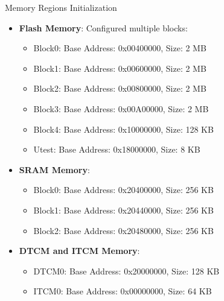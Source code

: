 \begin{frame}{Memory Regions Initialization}
    \begin{itemize}
        \item \textbf{Flash Memory}: Configured multiple blocks:
        \begin{itemize}
            \item Block0: Base Address: 0x00400000, Size: 2 MB
            \item Block1: Base Address: 0x00600000, Size: 2 MB
            \item Block2: Base Address: 0x00800000, Size: 2 MB
            \item Block3: Base Address: 0x00A00000, Size: 2 MB
            \item Block4: Base Address: 0x10000000, Size: 128 KB
            \item Utest: Base Address: 0x18000000, Size: 8 KB
        \end{itemize}
        \item \textbf{SRAM Memory}:
        \begin{itemize}
            \item Block0: Base Address: 0x20400000, Size: 256 KB
            \item Block1: Base Address: 0x20440000, Size: 256 KB
            \item Block2: Base Address: 0x20480000, Size: 256 KB
        \end{itemize}
        \item \textbf{DTCM and ITCM Memory}:
        \begin{itemize}
            \item DTCM0: Base Address: 0x20000000, Size: 128 KB
            \item ITCM0: Base Address: 0x00000000, Size: 64 KB
        \end{itemize}
    \end{itemize}
\end{frame}

